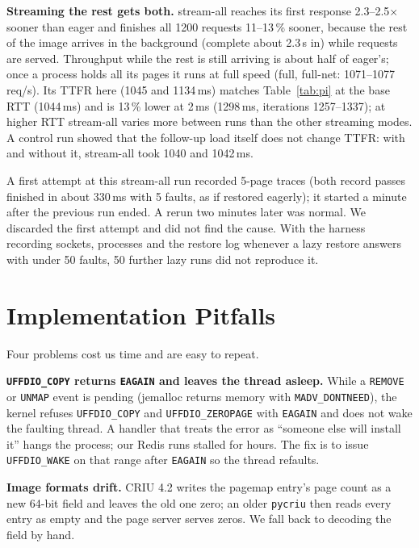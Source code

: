\documentclass[conference]{IEEEtran}
\newcommand{\mode}[1]{\textsf{#1}}
\begin{document}
\textbf{Streaming the rest gets both.} \mode{stream-all} reaches its first
response 2.3--2.5$\times$ sooner than eager and finishes all 1200 requests
11--13\,\% sooner, because the rest of the image arrives in the background
(complete about 2.3\,s in) while requests are served. Throughput while the
rest is still arriving is about half of eager's; once a process holds all
its pages it runs at full speed (\mode{full}, \mode{full-net}:
1071--1077\,req/s). Its TTFR here (1045 and 1134\,ms) matches
Table~\ref{tab:pi} at the base RTT (1044\,ms) and is 13\,\% lower at
2\,ms (1298\,ms, iterations 1257--1337); at higher RTT
\mode{stream-all} varies more between runs than the other streaming
modes. A control run showed that the follow-up load itself does not change
TTFR: with and without it, \mode{stream-all} took 1040 and 1042\,ms.

A first attempt at this \mode{stream-all} run recorded 5-page traces (both
record passes finished in about 330\,ms with 5 faults, as if restored
eagerly); it started a minute after the previous run ended. A rerun two
minutes later was normal. We discarded the first attempt and did not find
the cause. With the harness recording sockets, processes and the restore
log whenever a lazy restore answers with under 50 faults, 50 further lazy
runs did not reproduce it.

\section{Implementation Pitfalls}

Four problems cost us time and are easy to repeat.

\textbf{\texttt{UFFDIO\_COPY} returns \texttt{EAGAIN} and leaves the thread
asleep.} While a \texttt{REMOVE} or \texttt{UNMAP} event is pending (jemalloc
returns memory with \texttt{MADV\_DONTNEED}), the kernel refuses
\texttt{UFFDIO\_COPY} and \texttt{UFFDIO\_ZEROPAGE} with \texttt{EAGAIN}
and does not wake the faulting thread. A handler that treats the error as
``someone else will install it'' hangs the process; our Redis runs stalled
for hours. The fix is to issue \texttt{UFFDIO\_WAKE} on that range after
\texttt{EAGAIN} so the thread refaults.

\textbf{Image formats drift.} CRIU 4.2 writes the pagemap entry's page count
as a new 64-bit field and leaves the old one zero; an older \texttt{pycriu}
then reads every entry as empty and the page server serves zeros. We fall
back to decoding the field by hand.
\end{document}
